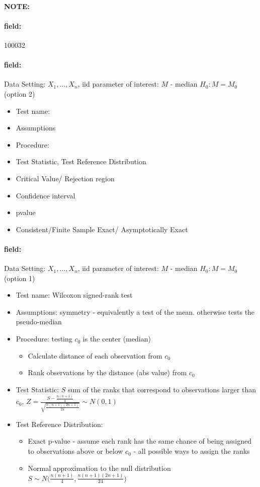 \documentclass[12pt]{article}
\newenvironment{note}{\paragraph{NOTE:}}{}
\newenvironment{field}{\paragraph{field:}}{}
\begin{document}
\begin{note} \begin{field} \tiny 100032 \end{field}
 \begin{field}
  Data Setting: $X_1, \ldots, X_n$, iid parameter of interest: $M$ - median $H_0: M = M_0$ (option 2)
  \begin{itemize}
   \item Test name:
   \item Assumptions
   \item Procedure:
   \item Test Statistic, Test Reference Distribution
   \item Critical Value/ Rejection region
   \item Confidence interval
   \item pvalue
   \item Consistent/Finite Sample Exact/ Asymptotically Exact
  \end{itemize}
 \end{field}
 \begin{field}
  Data Setting: $X_1, \ldots, X_n$, iid parameter of interest: $M$ - median $H_0: M = M_0$ (option 1)
  \begin{itemize}
   \item Test name: Wilcoxon signed-rank test
   \item Assumptions: symmetry - equivalently a test of the mean. otherwise tests the pseudo-median
   \item Procedure: testing $c_0$ is the center (median)
         \begin{itemize}
          \item Calculate distance of each observation from $c_0$
          \item Rank observations by the distance (abs value) from $c_0$
         \end{itemize}
   \item Test Statistic: $S$ sum of the ranks that correspond to observations larger than $c_0$, $Z = \frac{S - \frac{n(n+1)}{4}}{\sqrt{\frac{n(n+1)(2n+1)}{24}}} \sim N(0,1)$
   \item Test Reference Distribution:
         \begin{itemize}
          \item Exact p-value - assume each rank has the same chance of being assigned to observations above or below $c_0$ - all possible ways to assign the ranks
          \item Normal approximation to the null distribution $S \sim N\big(\frac{n(n+1)}{4}, \frac{n(n+1)(2n+1)}{24}\big)$

\end{itemize}
\end{itemize}
\end{field}
\end{note}
\end{document}
